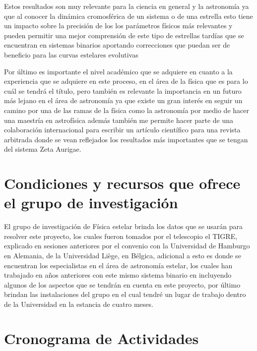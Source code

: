 \documentclass[11pt]{article}
\begin{document}
\noindent Estos resultados son muy relevante para la ciencia en general y la astronomía ya que al conocer la dinámica cromosférica de un sistema o de una estrella esto tiene un impacto sobre la precisión de los los parámetros físicos más relevantes y pueden permitir una mejor comprensión de este tipo de estrellas tardías que se encuentran en sistemas binarios aportando correcciones que puedan ser de beneficio para las curvas estelares evolutivas  

Por último es importante el nivel académico que se adquiere en cuanto a la experiencia que se adquiere en este proceso, en el área de la física que es para lo cuál se tendrá el título, pero también es relevante la importancia en un futuro más lejano en el área de astronomía ya que existe un gran  interés en seguir un camino por una de las ramas de la física como la astronomía por medio de hacer una maestría en astrofísica además también me permite hacer parte de una colaboración internacional para escribir un artículo científico para una revista arbitrada donde se vean reflejados los resultados más importantes que se tengan del sistema Zeta Aurigae.




\section{Condiciones y recursos que ofrece el grupo de investigación}
El grupo de investigación de Física estelar brinda los datos que se usarán para resolver este proyecto, los cuales fueron tomados por el telescopio el TIGRE, explicado en sesiones anteriores por el convenio con la Universidad de Hamburgo en Alemania, de la Universidad Liège, en Bélgica, adicional a esto es donde se encuentran los especialistas en el área de astronomía estelar, los cuales han trabajado en años anteriores con este mismo sistema binario en incluyendo algunos de los aspectos que se tendrán en cuenta en este proyecto, por último brindan las instalaciones del grupo en el cual tendré un lugar de trabajo dentro de la Universidad en la estancia de cuatro meses.
\section{Cronograma de Actividades}	
\end{document}
